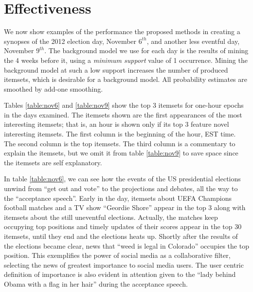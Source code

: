 \documentclass[letterpaper,12pt,titlepage,oneside,final]{book}
\begin{document}
\section{Effectiveness}

We now show examples of the performance the proposed methods in creating
a synopses of the 2012 election day, November $6^{th}$, and another less
eventful day, November $9^{th}$.
The background model we use for each day is the results of mining the 4 weeks
before it, using a \emph{minimum support} value of 1 occurrence.
Mining the background model at such a low support increases the number of
produced itemsets, which is desirable for a background model.
All probability estimates are smoothed by add-one smoothing. 

Tables \ref{table:nov6} and \ref{table:nov9}  show the top 3 itemsets for
one-hour epochs in the days examined.
The itemsets shown are the first appearances of the most interesting itemsets;
that is, an hour is shown only if its top 3 feature novel interesting itemsets. The first column is the beginning of the hour, EST time.
The second column is the top itemsets.
The third column is a commentary to explain the itemsets,
but we omit it from table \ref{table:nov9} to save space since the itemsets are self explanatory.

In table \ref{table:nov6}, we can see how the events of the US presidential
elections  unwind from ``get out and vote'' to the projections and debates,
all the way to the ``acceptance speech''.
Early in the day, itemsets about UEFA Champions football matches and a TV show
``Geordie Shore'' appear in the top 3 along with itemsets about the still
uneventful elections.
Actually, the matches keep occupying top positions and timely updates of their
scores appear in the top 30 itemsets, until they end and the elections
heats up.
Shortly after the results of the elections became clear, news that
``weed is legal in Colorado'' occupies the top position.
This exemplifies the power of social media as a collaborative filter,
selecting the news of greatest importance to social media users.
The user centric definition of importance is also evident in attention
given to the ``lady behind Obama  with a flag in her hair'' during the
acceptance speech. 
\end{document}
